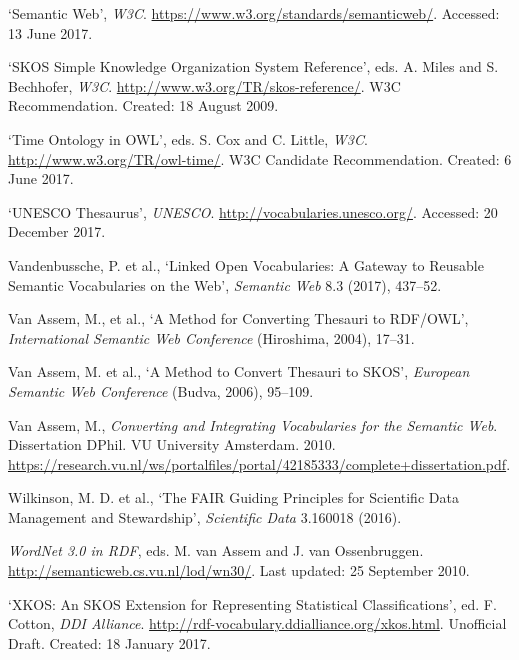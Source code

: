 \begin{list}{}

\item %
`Semantic Web', \textit{W3C}. \url{https://www.w3.org/standards/semanticweb/}. Accessed: 13 June 2017.

\item %
`SKOS Simple Knowledge Organization System Reference', eds. A. Miles and S. Bechhofer, \textit{W3C}. \url{http://www.w3.org/TR/skos-reference/}. W3C Recommendation. Created: 18 August 2009.

\item %
`Time Ontology in OWL', eds. S. Cox and C. Little, \textit{W3C}. \url{http://www.w3.org/TR/owl-time/}. W3C Candidate Recommendation. Created: 6 June 2017.

\item %
`UNESCO Thesaurus', \textit{UNESCO}. \url{http://vocabularies.unesco.org/}. Accessed: 20 December 2017.

\item %
Vandenbussche, P. et al., `Linked Open Vocabularies: A Gateway to Reusable Semantic Vocabularies on the Web', \textit{Semantic Web} 8.3 (2017), 437–52.

\item %
Van Assem, M., et al., `A Method for Converting Thesauri to RDF/OWL', \textit{International Semantic Web Conference} (Hiroshima, 2004), 17–31.

\item %
Van Assem, M. et al., `A Method to Convert Thesauri to SKOS', \textit{European Semantic Web Conference} (Budva, 2006), 95–109.

\item %
Van Assem, M., \textit{Converting and Integrating Vocabularies for the Semantic Web}. Dissertation DPhil. VU University Amsterdam. 2010. \url{https://research.vu.nl/ws/portalfiles/portal/42185333/complete+dissertation.pdf}. 

\item %
Wilkinson, M. D. et al., `The FAIR Guiding Principles for Scientific Data Management and Stewardship', \textit{Scientific Data} 3.160018 (2016).

\item %
\textit{WordNet 3.0 in RDF}, eds. M. van Assem and J. van Ossenbruggen. \url{http://semanticweb.cs.vu.nl/lod/wn30/}. Last updated: 25 September 2010.

\item %
`XKOS: An SKOS Extension for Representing Statistical Classifications', ed. F. Cotton, \textit{DDI Alliance}. \url{http://rdf-vocabulary.ddialliance.org/xkos.html}. Unofficial Draft. Created: 18 January 2017.

\end{list}